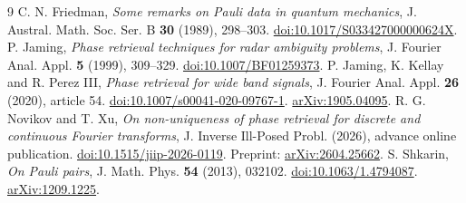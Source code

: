 \documentclass[11pt,reqno]{amsart}
\begin{document}
\begin{thebibliography}{9}
 C. N. Friedman, \emph{Some remarks on Pauli data in quantum mechanics}, J. Austral. Math. Soc. Ser. B \textbf{30} (1989), 298--303.
\href{https://doi.org/10.1017/S033427000000624X}{doi:10.1017/S033427000000624X}.
 P. Jaming, \emph{Phase retrieval techniques for radar ambiguity problems}, J. Fourier Anal. Appl. \textbf{5} (1999), 309--329.
\href{https://doi.org/10.1007/BF01259373}{doi:10.1007/BF01259373}.
 P. Jaming, K. Kellay and R. Perez III, \emph{Phase retrieval for wide band signals}, J. Fourier Anal. Appl. \textbf{26} (2020), article 54.
\href{https://doi.org/10.1007/s00041-020-09767-1}{doi:10.1007/s00041-020-09767-1}.
\href{https://arxiv.org/abs/1905.04095}{arXiv:1905.04095}.
 R. G. Novikov and T. Xu, \emph{On non-uniqueness of phase retrieval for discrete and continuous Fourier transforms}, J. Inverse Ill-Posed Probl. (2026), advance online publication.
\href{https://doi.org/10.1515/jiip-2026-0119}{doi:10.1515/jiip-2026-0119}. Preprint:
\href{https://arxiv.org/abs/2604.25662}{arXiv:2604.25662}.
 S. Shkarin, \emph{On Pauli pairs}, J. Math. Phys. \textbf{54} (2013), 032102.
\href{https://doi.org/10.1063/1.4794087}{doi:10.1063/1.4794087}.
\href{https://arxiv.org/abs/1209.1225}{arXiv:1209.1225}.
\end{thebibliography}
\end{document}
